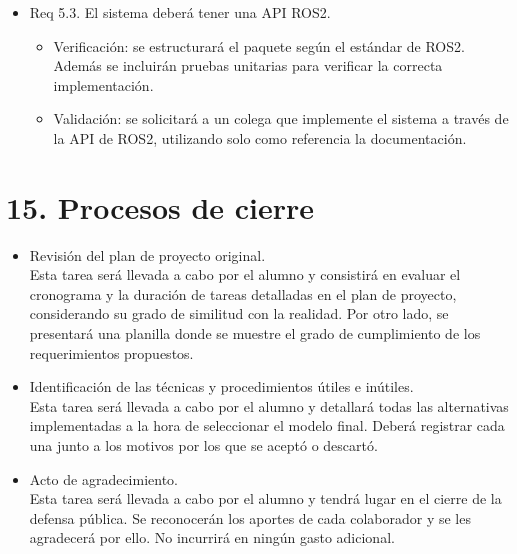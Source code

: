 \documentclass[
11pt, %
]{charter}
\begin{document}
\begin{itemize}
\item Req 5.3. El sistema deberá tener una API ROS2.
\begin{itemize}
	\item Verificación: se estructurará el paquete según el estándar de ROS2. Además se incluirán pruebas unitarias para verificar la correcta implementación.
	\item Validación: se solicitará a un colega que implemente el sistema a través de la API de ROS2, utilizando solo como referencia la documentación.
\end{itemize}

\end{itemize}

\section{15. Procesos de cierre}    
\label{sec:cierre}

\begin{itemize}
	\item Revisión del plan de proyecto original.\\
	 Esta tarea será llevada a cabo por el alumno y consistirá en evaluar el cronograma y la duración de tareas detalladas en el plan de proyecto, considerando su grado de similitud con la realidad. Por otro lado, se presentará una planilla donde se muestre el grado de cumplimiento de los requerimientos propuestos.
	\item Identificación de las técnicas y procedimientos útiles e inútiles.\\
	 Esta tarea será llevada a cabo por el alumno y detallará todas las alternativas implementadas a la hora de seleccionar el modelo final. Deberá registrar cada una junto a los motivos por los que se aceptó o descartó.
	\item Acto de agradecimiento.\\
	 Esta tarea será llevada a cabo por el alumno y tendrá lugar en el cierre de la defensa pública. Se reconocerán los aportes de cada colaborador y se les agradecerá por ello. No incurrirá en ningún gasto adicional.
\end{itemize}
\end{document}
